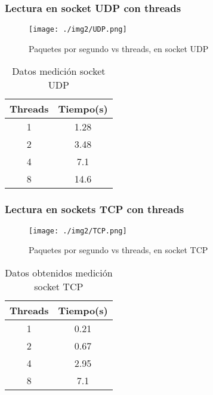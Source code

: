 \documentclass[12pt,spanish,letterpaper]{article}
\begin{document}
\subsubsection{Lectura en socket UDP con threads}
\begin{multicols}{2}
	\begin{figure}[H]
		\centering
		\texttt{[image: ./img2/UDP.png]}
		\caption{Paquetes por segundo vs threads, en socket UDP}
	\end{figure}
	\begin{table}[H]
		\centering
		\begin{tabular}{|c|c|}
		\hline
		Threads&Tiempo(s)\\
		\hline
		1&1.28\\
		2&3.48\\
		4&7.1\\
		8&14.6\\
		\hline
		\end{tabular}
		\caption{Datos medición socket UDP}
	\end{table}
\end{multicols}
\subsubsection{Lectura en sockets TCP con threads}
\begin{multicols}{2}
	\begin{figure}[H]
		\centering
		\texttt{[image: ./img2/TCP.png]}
		\caption{Paquetes por segundo vs threads, en socket TCP}
	\end{figure}
	\begin{table}[H]
		\centering
		\begin{tabular}{|c|c|}
		\hline
		Threads&Tiempo(s)\\
		\hline
		1&0.21\\
		2&0.67\\
		4&2.95\\
		8&7.1\\
		\hline
		\end{tabular}
		\caption{Datos obtenidos medición socket TCP}
	\end{table}
\end{multicols}
\end{document}
